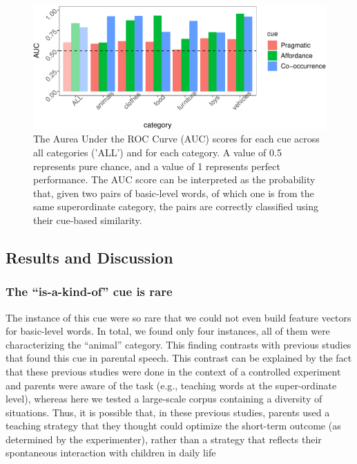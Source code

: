 \documentclass[10pt, letterpaper]{article}
\newenvironment{CodeChunk}{}{}
\begin{document}
\begin{CodeChunk}
\begin{figure}[h]

{\centering \includegraphics{cogsci_files/figure-latex/all_data-1} 

}

\caption{\label{fig:data_all} The Aurea Under the ROC Curve (AUC) scores for each cue across all categories ('ALL') and for each category. A value of 0.5 represents pure chance, and a value of 1 represents perfect performance. The AUC score can be interpreted as the probability that, given two pairs of basic-level words, of which one is from the same superordinate category, the pairs are correctly classified using their  cue-based similarity.}\label{fig:all_data}
\end{figure}
\end{CodeChunk}

\hypertarget{results-and-discussion}{%
\subsection{Results and Discussion}\label{results-and-discussion}}

\hypertarget{the-is-a-kind-of-cue-is-rare}{%
\subsubsection{The ``is-a-kind-of'' cue is
rare}\label{the-is-a-kind-of-cue-is-rare}}

The instance of this cue were so rare that we could not even build
feature vectors for basic-level words. In total, we found only four
instances, all of them were characterizing the ``animal'' category. This
finding contrasts with previous studies that found this cue in parental
speech. This contrast can be explained by the fact that these previous
studies were done in the context of a controlled experiment and parents
were aware of the task (e.g., teaching words at the super-ordinate
level), whereas here we tested a large-scale corpus containing a
diversity of situations. Thus, it is possible that, in these previous
studies, parents used a teaching strategy that they thought could
optimize the short-term outcome (as determined by the experimenter),
rather than a strategy that reflects their spontaneous interaction with
children in daily life
\end{document}
